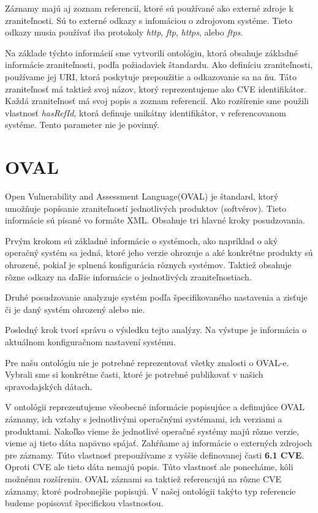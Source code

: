\documentclass[12pt, a4paper, oneside]{book}
\begin{document}
Záznamy majú aj zoznam referencií, ktoré sú používané ako externé zdroje k zraniteľnosti. Sú to externé odkazy s infomáciou o zdrojovom systéme. Tieto odkazy musia používať iba protokoly \textit{http}, \textit{ftp}, \textit{https}, alebo \textit{ftps}.


Na základe týchto informácií sme vytvorili ontológiu, ktorá obsahuje základné informácie zraniteľnosti, podľa požiadaviek štandardu. Ako definíciu zraniteľnosti, používame jej URI, ktorá poskytuje prepoužitie a odkazovanie sa na ňu. Táto zraniteľnosť má taktiež svoj názov, ktorý reprezentujeme ako CVE identifikátor. Každá zraniteľnosť má svoj popis a zoznam referencií. Ako rozšírenie sme použili vlastnosť \textit{hasRefId}, ktorá definuje unikátny identifikátor, v referencovanom systéme. Tento parameter nie je povinný.




\section{OVAL}
Open Vulnerability and Assessment Language(OVAL)\citep{oval} je štandard, ktorý umožňuje popísanie zraniteľností jednotlivých produktov (softvérov). Tieto informácie sú písané vo formáte XML. Obsahuje tri hlavné kroky posudzovania.


Prvým krokom sú základné informácie o systémoch, ako napríklad o aký operačný systém sa jedná, ktoré jeho verzie ohrozuje a aké konkrétne produkty sú ohrozené, pokiaľ je splnená konfigurácia rôznych systémov. Taktiež obsahuje rôzne odkazy na ďaľšie informácie o jednotlivých zraniteľnostiach. 


Druhé posudzovanie analyzuje systém podľa špecifikovaného nastavenia a zisťuje či je daný systém ohrozený alebo nie. 


Posledný krok tvorí správu o výsledku tejto analýzy. Na výstupe je informácia o aktuálnom konfiguračnom nastavení systému.


Pre našu ontológiu nie je potrebné reprezentovať všetky znalosti o OVAL-e. Vybrali sme si konkrétne časti, ktoré je potrebné publikovať v našich spravodajských dátach. 


V ontológii reprezentujeme všeobecné informácie popisujúce a definujúce OVAL záznamy, ich vzťahy s jednotlivými operačnými systémami, ich verziami a produktami. Nakoľko vieme že jednotlivé operačné systémy majú rôzne verzie, vieme aj tieto dáta napävno spájať. Zahŕňame aj informácie o externých zdrojoch pre záznamy. Túto vlastnosť prepoužívame z vyššie definovanej časti \textbf{6.1 CVE}. Oproti CVE ale tieto dáta nemajú popis. Túto vlastnosť ale ponecháme, kôli možnému rozšíreniu. OVAL záznami sa taktiež referencujú na rôzne CVE záznamy, ktoré podrobnejšie popisujú. V našej ontológii takýto typ referencie budeme popisovať špecifickou vlastnosťou.
\end{document}
